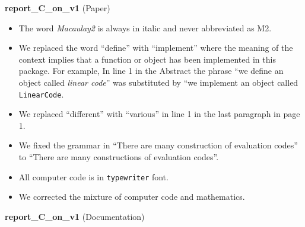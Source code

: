 \documentclass[12pt]{amsart}
\theoremstyle{plain}
\begin{document}
\begin{center}
{\bf report\_C\_on\_v1} (Paper)
\end{center}
\begin{itemize}
\item The word {\it Macaulay2} is always in italic and never abbreviated as M2.
\item We replaced the word ``define'' with ``implement'' where the meaning of the context implies that a function or object has been implemented in this package. For example, In line 1 in the Abstract the phrase ``we define an object called {\it linear code}'' was substituted by ``we implement an object called {\tt LinearCode}.
\item We replaced ``different'' with ``various'' in line 1 in the last paragraph in page 1.
\item We fixed the grammar in ``There are many construction of evaluation codes'' to ``There are many constructions of evaluation codes''.
\item All computer code is in {\tt typewriter} font.
\item We corrected the mixture of computer code and mathematics.
\end{itemize}
\begin{center}
{\bf report\_C\_on\_v1} (Documentation)
\end{center}
\end{document}
